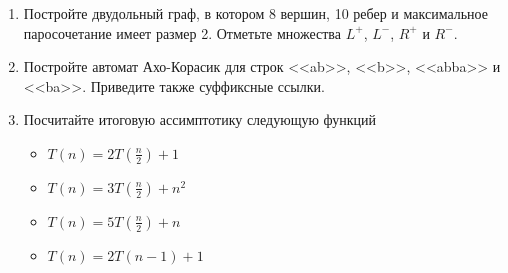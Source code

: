 \documentclass[10pt,a4paper,twocolumn,landscape,oneside]{article}
\begin{document}
\begin{enumerate}
\item
    Постройте двудольный граф, в котором 8 вершин, 10 ребер и максимальное паросочетание имеет
    размер 2. Отметьте множества $L^+$, $L^-$, $R^+$ и $R^-$.
    \vspace{5cm}
\pagebreak
    
\item
Постройте автомат Ахо-Корасик для строк <<ab>>, <<b>>, <<abba>> и <<ba>>.
Приведите также суффиксные ссылки.
\vspace{8cm}    

\item
Посчитайте итоговую ассимптотику следующую функций
\begin{itemize}
\item
$T(n) = 2 T(\frac{n}{2}) + 1$
\vspace{1cm}
\item
$T(n) = 3 T(\frac{n}{2}) + n^2$
\vspace{1cm}
\item
$T(n) = 5 T(\frac{n}{2}) + n$
\vspace{1cm}
\item
$T(n) = 2 T(n - 1) + 1$
\vspace{1cm}
\end{itemize}
    
\end{enumerate}
\end{document}
